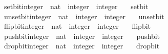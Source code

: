 \begin{isabellebody}
\ set{\isacharunderscore}{\kern0pt}bit{\isacharunderscore}{\kern0pt}integer\ {\isacharcolon}{\kern0pt}{\isacharcolon}{\kern0pt}\ {\isacartoucheopen}nat\ {\isasymRightarrow}\ integer\ {\isasymRightarrow}\ integer{\isacartoucheclose}\isanewline
\ \ \ set{\isacharunderscore}{\kern0pt}bit%
\isadelimproof
\ %
\endisadelimproof
%
\isatagproof
\isacommand{{\isachardot}{\kern0pt}}\isamarkupfalse%
%
\endisatagproof
{\isafoldproof}%
%
\isadelimproof
%
\endisadelimproof
\isanewline
\isanewline
{}\isamarkupfalse%
\ unset{\isacharunderscore}{\kern0pt}bit{\isacharunderscore}{\kern0pt}integer\ {\isacharcolon}{\kern0pt}{\isacharcolon}{\kern0pt}\ {\isacartoucheopen}nat\ {\isasymRightarrow}\ integer\ {\isasymRightarrow}\ integer{\isacartoucheclose}\isanewline
\ \ \ unset{\isacharunderscore}{\kern0pt}bit%
\isadelimproof
\ %
\endisadelimproof
%
\isatagproof
\isacommand{{\isachardot}{\kern0pt}}\isamarkupfalse%
%
\endisatagproof
{\isafoldproof}%
%
\isadelimproof
%
\endisadelimproof
\isanewline
\isanewline
{}\isamarkupfalse%
\ flip{\isacharunderscore}{\kern0pt}bit{\isacharunderscore}{\kern0pt}integer\ {\isacharcolon}{\kern0pt}{\isacharcolon}{\kern0pt}\ {\isacartoucheopen}nat\ {\isasymRightarrow}\ integer\ {\isasymRightarrow}\ integer{\isacartoucheclose}\isanewline
\ \ \ flip{\isacharunderscore}{\kern0pt}bit%
\isadelimproof
\ %
\endisadelimproof
%
\isatagproof
\isacommand{{\isachardot}{\kern0pt}}\isamarkupfalse%
%
\endisatagproof
{\isafoldproof}%
%
\isadelimproof
%
\endisadelimproof
\isanewline
\isanewline
{}\isamarkupfalse%
\ push{\isacharunderscore}{\kern0pt}bit{\isacharunderscore}{\kern0pt}integer\ {\isacharcolon}{\kern0pt}{\isacharcolon}{\kern0pt}\ {\isacartoucheopen}nat\ {\isasymRightarrow}\ integer\ {\isasymRightarrow}\ integer{\isacartoucheclose}\isanewline
\ \ \ push{\isacharunderscore}{\kern0pt}bit%
\isadelimproof
\ %
\endisadelimproof
%
\isatagproof
\isacommand{{\isachardot}{\kern0pt}}\isamarkupfalse%
%
\endisatagproof
{\isafoldproof}%
%
\isadelimproof
%
\endisadelimproof
\isanewline
\isanewline
{}\isamarkupfalse%
\ drop{\isacharunderscore}{\kern0pt}bit{\isacharunderscore}{\kern0pt}integer\ {\isacharcolon}{\kern0pt}{\isacharcolon}{\kern0pt}\ {\isacartoucheopen}nat\ {\isasymRightarrow}\ integer\ {\isasymRightarrow}\ integer{\isacartoucheclose}\isanewline
\ \ \ drop{\isacharunderscore}{\kern0pt}bit%

\end{isabellebody}

